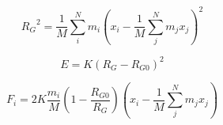 


$$
{R_G}^2 = \frac{1}{M}\sum_{i}^{N}{m_{i}\left( x_{i} -
\frac{1}{M}\sum_{j}^{N}{m_{j}x_{j}} \right)^{2}}
$$

$$
 E = K\left( R_G - R_{G0} \right)^{2}
$$

$$
F_{i} = 2K\frac{m_{i}}{M}\left( 1-\frac{R_{G0}}{R_G}
\right)\left( x_{i} - \frac{1}{M}\sum_{j}^{N}{m_{j}x_{j}} \right)
$$

